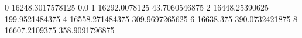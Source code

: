 0 16248.3017578125 0.0
1 16292.0078125 43.7060546875
2 16448.25390625 199.9521484375
4 16558.271484375 309.9697265625
6 16638.375 390.0732421875
8 16607.2109375 358.9091796875
